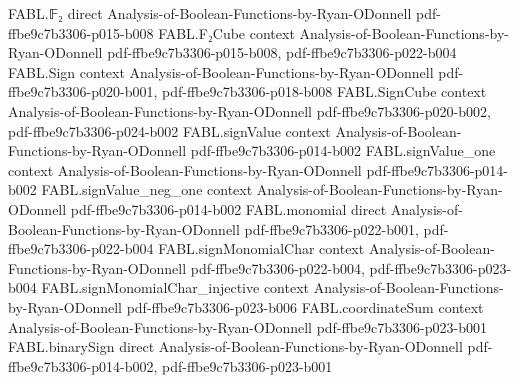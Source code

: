 \begin{theorem}
\label{FABL.RandomizedDecisionTree.symmetrization_queryProbability}
\leanok
{}
\proofstep
  {FABL.𝔽₂}
  {direct}
  {Analysis-of-Boolean-Functions-by-Ryan-ODonnell}
  {pdf-ffbe9c7b3306-p015-b008}
\proofstep
  {FABL.F₂Cube}
  {context}
  {Analysis-of-Boolean-Functions-by-Ryan-ODonnell}
  {pdf-ffbe9c7b3306-p015-b008,
    pdf-ffbe9c7b3306-p022-b004}
\proofstep
  {FABL.Sign}
  {context}
  {Analysis-of-Boolean-Functions-by-Ryan-ODonnell}
  {pdf-ffbe9c7b3306-p020-b001,
    pdf-ffbe9c7b3306-p018-b008}
\proofstep
  {FABL.SignCube}
  {context}
  {Analysis-of-Boolean-Functions-by-Ryan-ODonnell}
  {pdf-ffbe9c7b3306-p020-b002,
    pdf-ffbe9c7b3306-p024-b002}
\proofstep
  {FABL.signValue}
  {context}
  {Analysis-of-Boolean-Functions-by-Ryan-ODonnell}
  {pdf-ffbe9c7b3306-p014-b002}
\proofstep
  {FABL.signValue_one}
  {context}
  {Analysis-of-Boolean-Functions-by-Ryan-ODonnell}
  {pdf-ffbe9c7b3306-p014-b002}
\proofstep
  {FABL.signValue_neg_one}
  {context}
  {Analysis-of-Boolean-Functions-by-Ryan-ODonnell}
  {pdf-ffbe9c7b3306-p014-b002}
\proofstep
  {FABL.monomial}
  {direct}
  {Analysis-of-Boolean-Functions-by-Ryan-ODonnell}
  {pdf-ffbe9c7b3306-p022-b001,
    pdf-ffbe9c7b3306-p022-b004}
\proofstep
  {FABL.signMonomialChar}
  {context}
  {Analysis-of-Boolean-Functions-by-Ryan-ODonnell}
  {pdf-ffbe9c7b3306-p022-b004,
    pdf-ffbe9c7b3306-p023-b004}
\proofstep
  {FABL.signMonomialChar_injective}
  {context}
  {Analysis-of-Boolean-Functions-by-Ryan-ODonnell}
  {pdf-ffbe9c7b3306-p023-b006}
\proofstep
  {FABL.coordinateSum}
  {context}
  {Analysis-of-Boolean-Functions-by-Ryan-ODonnell}
  {pdf-ffbe9c7b3306-p023-b001}
\proofstep
  {FABL.binarySign}
  {direct}
  {Analysis-of-Boolean-Functions-by-Ryan-ODonnell}
  {pdf-ffbe9c7b3306-p014-b002,
    pdf-ffbe9c7b3306-p023-b001}

\end{theorem}

